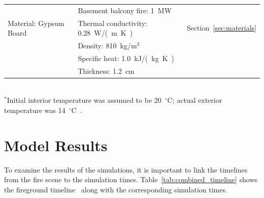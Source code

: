 \documentclass[12pt,oneside]{book}
\begin{document}
\begin{table}[!ht]
\begin{tabular}{lll}
                                             &  Basement balcony fire: 1~MW                  &                                    \\
Material: Gypsum Board~\cite{WAKILI2007}     &  Thermal conductivity: 0.28~\si{W/(m.K)}      &  Section~\ref{sec:materials}       \\
                                             &  Density: 810~kg/m$^3$                        &                                    \\
                                             &  Specific heat: 1.0~\si{kJ/(kg.K)}            &                                    \\
                                             &  Thickness: 1.2~\si{cm}                       &                                    \\
\bottomrule
\end{tabular}
\footnotesize
\\ $^{*}$Initial interior temperature was assumed to be 20~$^{\circ}$C; actual exterior temperature was 14~$^{\circ}$C~\cite{NIOSH:Bowyer2}.
\normalsize
\label{tab:model_parameters}
\end{table}


\chapter{Model Results}
\label{sec:model_results}

To examine the results of the simulations, it is important to link the timelines from the fire scene to the simulation times. Table~\ref{tab:combined_timeline} shows the fireground timeline~\cite{NIOSH:Bowyer2} along with the corresponding simulation times.
\end{document}
